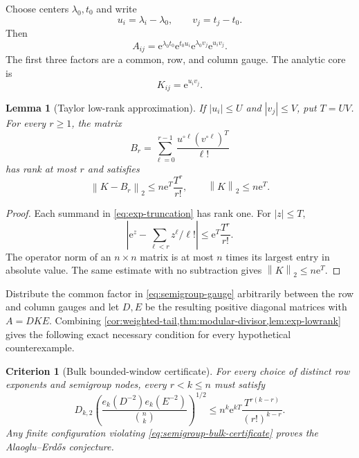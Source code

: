 \documentclass[11pt,oneside]{article}
\newtheorem{lemma}[theorem]{Lemma}
\newtheorem{criterion}[theorem]{Criterion}
\theoremstyle{definition}
\theoremstyle{remark}
\newcommand{\AEconj}{Alaoglu--Erd\H{o}s}
\newcommand{\norm}[1]{\left\lVert #1\right\rVert}
\newcommand{\abs}[1]{\left\lvert #1\right\rvert}
\newcommand{\e}{\mathrm{e}}
\begin{document}
Choose centers $\lambda_0,t_0$ and write
\[
 u_i=\lambda_i-\lambda_0,
 \qquad v_j=t_j-t_0.
\]
Then
\begin{equation}
 A_{ij}
 =\e^{\lambda_0t_0}\e^{t_0u_i}\e^{\lambda_0v_j}\e^{u_iv_j}.
 \label{eq:semigroup-gauge}
\end{equation}
The first three factors are a common, row, and column gauge.  The analytic core is
\begin{equation}
 K_{ij}=\e^{u_iv_j}.
 \label{eq:exp-core}
\end{equation}

\begin{lemma}[Taylor low-rank approximation]
\label{lem:exp-lowrank}
If $\abs{u_i}\le U$ and $\abs{v_j}\le V$, put $T=UV$.  For every $r\ge1$, the matrix
\begin{equation}
 B_r=\sum_{\ell=0}^{r-1}\frac{u^{\circ\ell}(v^{\circ\ell})^T}{\ell!}
 \label{eq:exp-truncation}
\end{equation}
has rank at most $r$ and satisfies
\begin{equation}
 \norm{K-B_r}_2\le n\e^T\frac{T^r}{r!},
 \qquad
 \norm K_2\le n\e^T.
 \label{eq:exp-error}
\end{equation}
\end{lemma}

\begin{proof}
Each summand in \eqref{eq:exp-truncation} has rank one.  For $|z|\le T$,
\[
 \abs{\e^z-\sum_{\ell<r}z^\ell/\ell!}
 \le\e^T\frac{T^r}{r!}.
\]
The operator norm of an $n\times n$ matrix is at most $n$ times its largest entry in absolute value.  The same estimate with no subtraction gives $\norm K_2\le n\e^T$.
\end{proof}

Distribute the common factor in \eqref{eq:semigroup-gauge} arbitrarily between the row and column gauges and let $D,E$ be the resulting positive diagonal matrices with $A=DKE$.  Combining \cref{cor:weighted-tail,thm:modular-divisor,lem:exp-lowrank} gives the following exact necessary condition for every hypothetical counterexample.

\begin{criterion}[Bulk bounded-window certificate]
\label{crit:semigroup-bulk}
For every choice of distinct row exponents and semigroup nodes, every $r<k\le n$ must satisfy
\begin{equation}
 D_{k,2}
 \left(
 \frac{e_k(D^{-2})e_k(E^{-2})}{\binom nk}
 \right)^{1/2}
 \le
 n^k\e^{kT}
 \frac{T^{r(k-r)}}{(r!)^{k-r}}.
 \label{eq:semigroup-bulk-certificate}
\end{equation}
Any finite configuration violating \eqref{eq:semigroup-bulk-certificate} proves the \AEconj{} conjecture.
\end{criterion}
\end{document}
